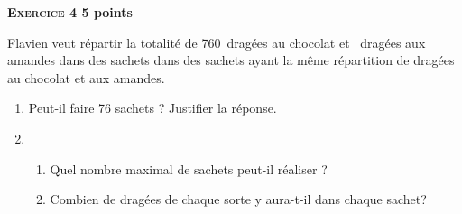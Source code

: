 \textbf{\textsc{Exercice 4} \hfill 5 points}

\medskip

Flavien veut répartir la totalité de 760~dragées au chocolat et ~dragées aux amandes dans des sachets dans des sachets ayant la même répartition de dragées au chocolat et aux amandes.

\medskip
 
\begin{enumerate}
\item Peut-il faire 76 sachets ? Justifier la réponse. 
\item 
	\begin{enumerate}
		\item Quel nombre maximal de sachets peut-il réaliser ? 
		\item Combien de dragées de chaque sorte y aura-t-il dans chaque sachet?
	\end{enumerate}
\end{enumerate}
 
\vspace{0,5cm}

